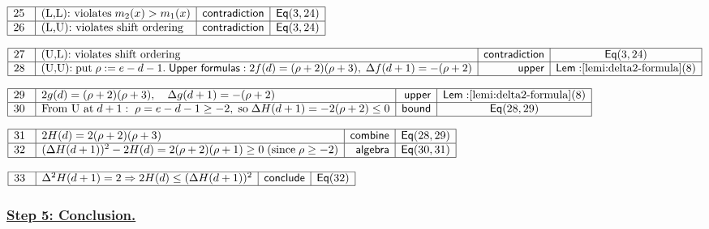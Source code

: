 \documentclass[11pt,reqno]{amsart}
\begin{document}
\nointerlineskip\noindent$%
\begin{array}{|m{0.5cm}|l|r|c|}
\hline
25 & \text{(L,L):\ violates}\;m_{2}(x)>m_{1}(x) & \mathsf{contradiction} & 
\mathsf{Eq}(3,24) \\ \hline
26 & \text{(L,U):\ violates\ shift\ ordering} & \mathsf{contradiction} & 
\mathsf{Eq}(3,24) \\ \hline
\end{array}%
$

\nointerlineskip\noindent$%
\begin{array}{|m{0.5cm}|l|r|c|}
\hline
27 & \text{(U,L):\ violates\ shift\ ordering} & \mathsf{contradiction} & 
\mathsf{Eq}(3,24) \\ \hline
28 & \text{(U,U):\;put}\;\rho:=e-d-1.\;\mathsf{Upper\ formulas:}%
\;2f(d)=(\rho+2)(\rho+3),\;\Delta f(d+1)=-(\rho+2) & \mathsf{upper} & 
\mathsf{Lem:}\ref{lemi:delta2-formula}(8) \\ \hline
\end{array}%
$

\nointerlineskip\noindent$%
\begin{array}{|m{0.5cm}|l|r|c|}
\hline
29 & 2g(d)=(\rho+2)(\rho+3),\quad\Delta g(d+1)=-(\rho+2) & \mathsf{upper} & 
\mathsf{Lem:}\ref{lemi:delta2-formula}(8) \\ \hline
30 & \text{From U at}\;d+1:\;\rho=e-d-1\ge-2,\;\text{so}\;\Delta
H(d+1)=-2(\rho+2)\le0 & \mathsf{bound} & \mathsf{Eq}(28,29) \\ \hline
\end{array}%
$

\nointerlineskip\noindent$%
\begin{array}{|m{0.5cm}|l|r|c|}
\hline
31 & 2H(d)=2(\rho+2)(\rho+3) & \mathsf{combine} & \mathsf{Eq}(28,29) \\ 
\hline
32 & (\Delta H(d+1))^{2}-2H(d)=2(\rho+2)(\rho+1)\ge0\;\text{(since}%
\;\rho\ge-2) & \mathsf{algebra} & \mathsf{Eq}(30,31) \\ \hline
\end{array}%
$

\nointerlineskip\noindent$%
\begin{array}{|m{0.5cm}|l|r|c|}
\hline
33 & \Delta^{2}H(d+1)=2\Rightarrow2H(d)\le(\Delta H(d+1))^{2} & \mathsf{%
conclude} & \mathsf{Eq}(32) \\ \hline
\end{array}%
$

\subsubsection*{\protect\underline{Step 5: Conclusion.}}
\end{document}
